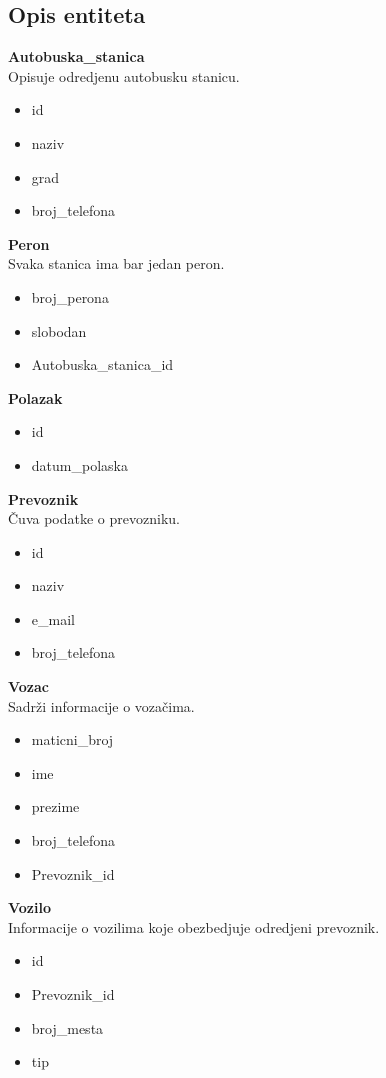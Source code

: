 \subsection{Opis entiteta}

\textbf{Autobuska\_stanica} \\
Opisuje odredjenu autobusku stanicu.
\begin{itemize}
	\item id
	\item naziv
	\item grad
	\item broj\_telefona
\end{itemize}
\textbf{Peron} \\
Svaka stanica ima bar jedan peron.
\begin{itemize}
	\item broj\_perona
	\item slobodan
	\item Autobuska\_stanica\_id 
\end{itemize}
\textbf{Polazak} \\
\begin{itemize}
	\item id
	\item datum\_polaska
\end{itemize}
\textbf{Prevoznik} \\
\v Cuva podatke o prevozniku.
\begin{itemize}
	\item id
	\item naziv
	\item e\_mail
	\item broj\_telefona
\end{itemize}
\textbf{Vozac} \\
Sadr\v zi informacije o voza\v cima.
\begin{itemize}
	\item maticni\_broj
	\item ime
	\item prezime
	\item broj\_telefona
	\item Prevoznik\_id
\end{itemize}
\textbf{Vozilo} \\
Informacije o vozilima koje obezbedjuje odredjeni prevoznik.
\begin{itemize}
	\item id
	\item Prevoznik\_id
	\item broj\_mesta
	\item tip
\end{itemize}
